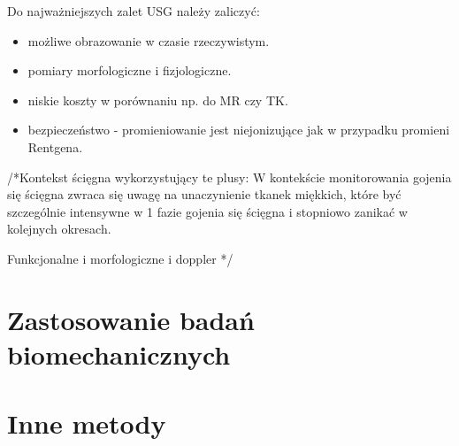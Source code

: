 Do najważniejszych zalet USG należy zaliczyć:
\begin{itemize}
	\item możliwe obrazowanie w czasie rzeczywistym.
	\item pomiary morfologiczne i fizjologiczne.
	\item niskie koszty w porównaniu np. do MR czy TK.
	\item bezpieczeństwo - promieniowanie jest niejonizujące jak w przypadku promieni Rentgena.
\end{itemize}

/*Kontekst ścięgna wykorzystujący te plusy:
W kontekście monitorowania gojenia się ścięgna zwraca się uwagę na unaczynienie tkanek miękkich, które być szczególnie intensywne w 1 fazie gojenia się ścięgna i stopniowo zanikać w kolejnych okresach.

Funkcjonalne i morfologiczne i doppler
*/

\section{Zastosowanie badań biomechanicznych}
\section{Inne metody}